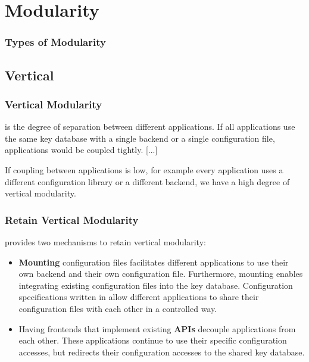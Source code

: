 \section{Modularity}




\begin{frame}
	\frametitle{Types of Modularity}
	\Large
\end{frame}

\subsection{Vertical}

\begin{frame}[fragile]
	\frametitle{Vertical Modularity \cite{raab2016improving}}

	 is the degree of separation between different applications.
	If all applications use the same key database with a single backend or a single configuration file, applications would be coupled tightly.
	[...]

	If coupling between applications is low, for example every application uses a different configuration library or a different backend, we have a high degree of vertical modularity.
\end{frame}


\begin{frame}
	\frametitle{Retain Vertical Modularity \cite{raab2016improving}}

	\elektra{} provides two mechanisms to retain vertical modularity:

	\begin{itemize}
	\item \textbf{Mounting} configuration files facilitates different applications to use their own backend and their own configuration file.
	Furthermore, mounting enables integrating existing configuration files into the key database.
	Configuration specifications written in  allow different applications to share their configuration files with each other in a controlled way.

	\item Having frontends that implement existing \textbf{APIs} decouple applications from each other.
	These applications continue to use their specific configuration accesses, but \elektra{} redirects their configuration accesses to the shared key database.
	\end{itemize}
\end{frame}

